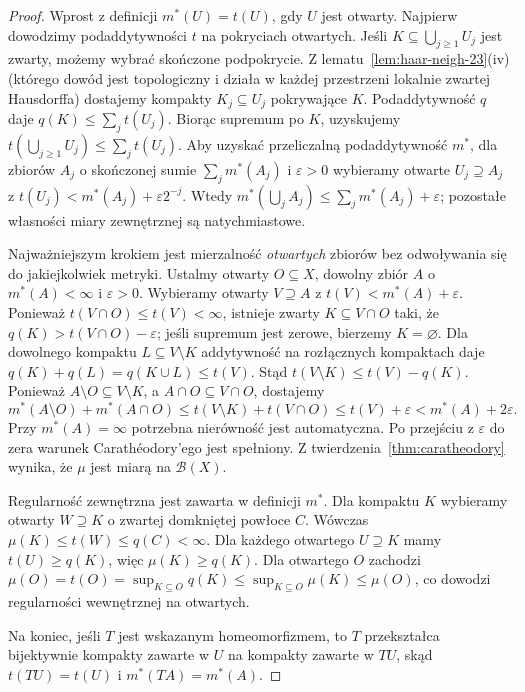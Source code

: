 \begin{proof}
Wprost z definicji $m^*(U)=t(U)$, gdy $U$ jest otwarty.
Najpierw dowodzimy podaddytywności $t$ na pokryciach
otwartych. Jeśli $K\subseteq\bigcup_{j\ge1}U_j$ jest
zwarty, możemy wybrać skończone podpokrycie.
Z lematu~\ref{lem:haar-neigh-23}(iv) (którego dowód
jest topologiczny i działa w każdej przestrzeni lokalnie
zwartej Hausdorffa) dostajemy kompakty
$K_j\subseteq U_j$ pokrywające $K$. Podaddytywność $q$
daje $q(K)\le\sum_jt(U_j)$. Biorąc supremum po $K$,
uzyskujemy
$t(\bigcup_{j\ge1}U_j)\le\sum_jt(U_j)$.
Aby uzyskać przeliczalną podaddytywność $m^*$,
dla zbiorów $A_j$ o skończonej sumie $\sum_jm^*(A_j)$
i $\varepsilon>0$ wybieramy otwarte $U_j\supseteq A_j$
z $t(U_j)<m^*(A_j)+\varepsilon2^{-j}$.
Wtedy $m^*(\bigcup_jA_j)\le\sum_jm^*(A_j)+\varepsilon$;
pozostałe własności miary zewnętrznej są natychmiastowe.

Najważniejszym krokiem jest mierzalność \emph{otwartych}
zbiorów bez odwoływania się do jakiejkolwiek metryki.
Ustalmy otwarty $O\subseteq X$, dowolny zbiór $A$
o $m^*(A)<\infty$ i $\varepsilon>0$.
Wybieramy otwarty $V\supseteq A$ z
$t(V)<m^*(A)+\varepsilon$. Ponieważ
$t(V\cap O)\le t(V)<\infty$, istnieje zwarty
$K\subseteq V\cap O$ taki, że
$q(K)>t(V\cap O)-\varepsilon$; jeśli supremum
jest zerowe, bierzemy $K=\varnothing$.
Dla dowolnego kompaktu $L\subseteq V\setminus K$
addytywność na rozłącznych kompaktach daje
$q(K)+q(L)=q(K\cup L)\le t(V)$.
Stąd $t(V\setminus K)\le t(V)-q(K)$.
Ponieważ $A\setminus O\subseteq V\setminus K$,
a $A\cap O\subseteq V\cap O$, dostajemy
\[
 m^*(A\setminus O)+m^*(A\cap O)
 \le t(V\setminus K)+t(V\cap O)
 \le t(V)+\varepsilon<m^*(A)+2\varepsilon.
\]
Przy $m^*(A)=\infty$ potrzebna nierówność
jest automatyczna. Po przejściu z $\varepsilon$ do
zera warunek Carathéodory'ego jest spełniony.
Z twierdzenia~\ref{thm:caratheodory} wynika,
że $\mu$ jest miarą na $\mathcal B(X)$.

Regularność zewnętrzna jest zawarta w definicji $m^*$.
Dla kompaktu $K$ wybieramy otwarty $W\supseteq K$
o zwartej domkniętej powłoce $C$. Wówczas
$\mu(K)\le t(W)\le q(C)<\infty$.
Dla każdego otwartego $U\supseteq K$ mamy
$t(U)\ge q(K)$, więc $\mu(K)\ge q(K)$.
Dla otwartego $O$ zachodzi
$\mu(O)=t(O)=\sup_{K\subseteq O}q(K)
\le\sup_{K\subseteq O}\mu(K)\le\mu(O)$,
co dowodzi regularności wewnętrznej na otwartych.

Na koniec, jeśli $T$ jest wskazanym homeomorfizmem,
to $T$ przekształca bijektywnie kompakty zawarte w $U$
na kompakty zawarte w $TU$, skąd
$t(TU)=t(U)$ i $m^*(TA)=m^*(A)$.
\end{proof}

